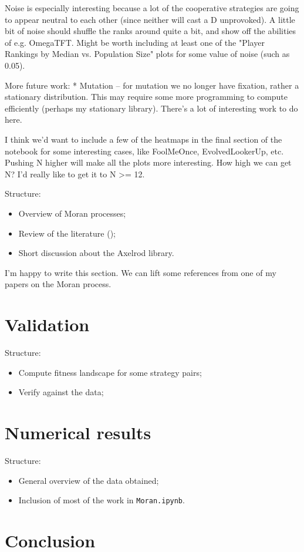 \documentclass{article}
\begin{document}
Noise is especially interesting because a lot of the cooperative strategies are going to appear neutral to each other (since neither will cast a D unprovoked). A little bit of noise should shuffle the ranks around quite a bit, and show off the abilities of e.g. OmegaTFT. Might be worth including at least one of the "Player Rankings by Median vs. Population Size" plots for some value of noise (such as 0.05).

More future work:
* Mutation -- for mutation we no longer have fixation, rather a stationary distribution. This may require some more programming to compute efficiently (perhaps my stationary library). There's a lot of interesting work to do here.

I think we'd want to include a few of the heatmaps in the final section of the notebook for some interesting cases, like FoolMeOnce, EvolvedLookerUp, etc. Pushing N higher will make all the plots more interesting. How high we can get N? I'd really like to get it to N >= 12.


Structure:

\begin{itemize}
    \item Overview of Moran processes;
    \item Review of the literature (\cite{Lee2015, Nowak});
    \item Short discussion about the Axelrod library.
\end{itemize}

I'm happy to write this section. We can lift some references from one of my papers on the Moran process.

\section{Validation}\label{sec:validation}

Structure:

\begin{itemize}
    \item Compute fitness landscape for some strategy pairs;
    \item Verify against the data;
\end{itemize}

\section{Numerical results}\label{sec:numerical_results}

Structure:

\begin{itemize}
    \item General overview of the data obtained;
    \item Inclusion of most of the work in \texttt{Moran.ipynb}.
\end{itemize}

\section{Conclusion}\label{sec:conclusion}



\end{document}
